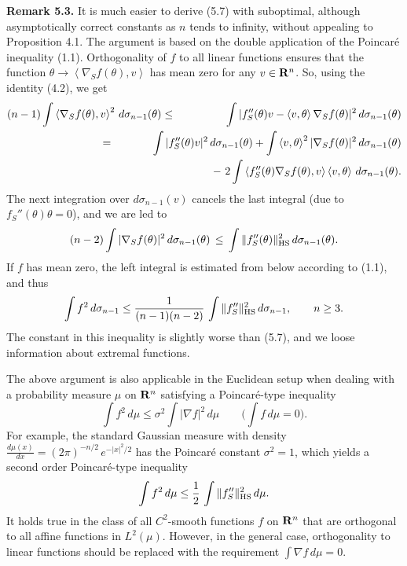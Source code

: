 \documentclass[reqno,12pt]{amsart}
\theoremstyle{plain}
\begin{document}
\vskip5mm
{\bf Remark 5.3.} It is much easier to derive (5.7) with suboptimal,
although asymptotically correct constants as $n$ tends to infinity,
without appealing to Proposition 4.1. The argument is based on the double
application of the Poincar\'e inequality (1.1). Orthogonality of $f$ to
all linear functions ensures that the function 
$\theta \rightarrow \left<\nabla_S f(\theta),v\right>$ has mean
zero for any $v \in {{\bf R}}^n$. So, using the identity (4.2), we get
\begin{eqnarray*}
(n-1)\int \left<\nabla_S f(\theta),v\right>^2\,d\sigma_{n-1}(\theta) 
 & \leq &
\int 
|f''_S(\theta) v - \left<v,\theta\right> 
\nabla_S f(\theta)|^2\,d\sigma_{n-1}(\theta) \\
 & \hskip-20mm = &
\hskip-10mm \int |f''_S(\theta) v|^2\,d\sigma_{n-1}(\theta) + 
\int \left<v,\theta\right>^2 |\nabla_S f(\theta)|^2\,d\sigma_{n-1}(\theta) \\
 & & \hskip-15mm - \
2 \int \left<f_S''(\theta) \nabla_S f(\theta),v\right>\left<v,\theta\right>
\,d\sigma_{n-1}(\theta).
\end{eqnarray*}
The next integration over $d\sigma_{n-1}(v)$ cancels the last integral
(due to $f_S''(\theta) \theta = 0$), and we are led to
$$
(n-2)\int |\nabla_S f(\theta)|^2\,d\sigma_{n-1}(\theta) 
 \, \leq \, \int \|f''_S(\theta)\|_{\rm HS}^2\,d\sigma_{n-1}(\theta).
$$
If $f$ has mean zero, the left integral is estimated from below
according to (1.1), and thus
$$
\int f^2\,d\sigma_{n-1} \leq \frac{1}{(n-1)(n-2)}\,
\int \|f''_S\|_{{\rm HS}}^2\,d\sigma_{n-1}, \qquad n \geq 3.
$$
The constant in this inequality is slightly worse than (5.7), and we loose
information about extremal functions.

The above argument is also applicable in the Euclidean setup when dealing 
with a probability measure $\mu$ on ${{\bf R}}^n$ satisfying a Poincar\'e-type
inequality
$$
\int f^2\,d\mu \leq \sigma^2 \int |\nabla f|^2\,d\mu \qquad
\bigg(\int f\,d\mu = 0\bigg).
$$
For example, the standard Gaussian measure with density
$
\frac{d\mu(x)}{dx} = (2\pi)^{-n/2}\,e^{-|x|^2/2}
$
has the Poincar\'e constant $\sigma^2 = 1$, which yields a second order
Poincar\'e-type inequality
$$
\int f^2\,d\mu \leq \frac{1}{2}\,
\int \|f''_S\|_{{\rm HS}}^2\,d\mu.
$$
It holds true in the class of all $C^2$-smooth functions $f$ 
on ${{\bf R}}^n$ that are orthogonal to all affine functions in $L^2(\mu)$.
However, in the general case, orthogonality to linear functions
should be replaced with the requirement $\int \nabla f\,d\mu = 0$.
\end{document}

